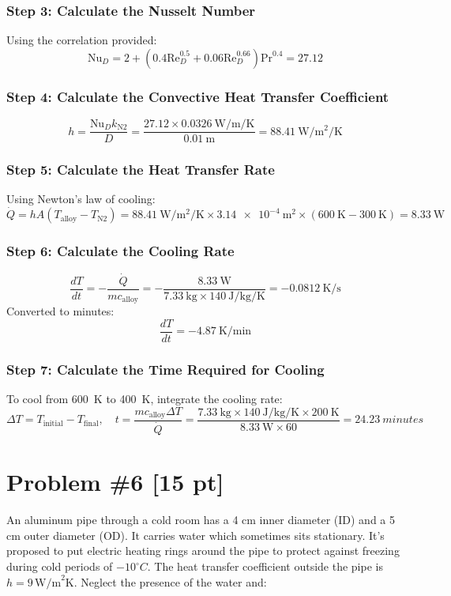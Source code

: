 \documentclass{article}
\begin{document}
\subsubsection*{Step 3: Calculate the Nusselt Number}
Using the correlation provided:
\[
\text{Nu}_D = 2 + (0.4 \text{Re}_D^{0.5} + 0.06 \text{Re}_D^{0.66}) \text{Pr}^{0.4} = 27.12
\]

\subsubsection*{Step 4: Calculate the Convective Heat Transfer Coefficient}
\[
h = \frac{\text{Nu}_D k_{\text{N2}}}{D} = \frac{27.12 \times \SI{0.0326}{\watt\per\meter\per\kelvin}}{\SI{0.01}{\meter}} = \SI{88.41}{\watt\per\meter\squared\per\kelvin}
\]

\subsubsection*{Step 5: Calculate the Heat Transfer Rate}
Using Newton's law of cooling:
\[
\dot{Q} = h A (T_{\text{alloy}} - T_{\text{N2}}) = \SI{88.41}{\watt\per\meter\squared\per\kelvin} \times \SI{3.14e-4}{\meter\squared} \times (\SI{600}{\kelvin} - \SI{300}{\kelvin}) = \SI{8.33}{\watt}
\]

\subsubsection*{Step 6: Calculate the Cooling Rate}
\[
\frac{dT}{dt} = -\frac{\dot{Q}}{m c_{\text{alloy}}} = -\frac{\SI{8.33}{\watt}}{\SI{7.33}{\kilogram} \times \SI{140}{\joule\per\kilogram\per\kelvin}} = \SI{-0.0812}{\kelvin\per\second}
\]
Converted to minutes:
\[
\frac{dT}{dt} = \SI{-4.87}{\kelvin\per\minute}
\]

\subsubsection*{Step 7: Calculate the Time Required for Cooling}
To cool from \SI{600}{\kelvin} to \SI{400}{\kelvin}, integrate the cooling rate:
\[
\Delta T = T_{\text{initial}} - T_{\text{final}}, \quad t = \frac{m c_{\text{alloy}} \Delta T}{\dot{Q}} = \frac{\SI{7.33}{\kilogram} \times \SI{140}{\joule\per\kilogram\per\kelvin} \times \SI{200}{\kelvin}}{\SI{8.33}{\watt} \times 60} = \SI{24.23}{minutes}
\]

\newpage
\section{Problem \#6 [15 pt]}
An aluminum pipe through a cold room has a 4 cm inner diameter (ID) and a 5 cm outer diameter (OD). It carries water which sometimes sits stationary. It's proposed to put electric heating rings around the pipe to protect against freezing during cold periods of \(-10 ^\circ C\). The heat transfer coefficient outside the pipe is \( h = 9 \, \text{W/m}^2\text{K} \). Neglect the presence of the water and:
\end{document}
